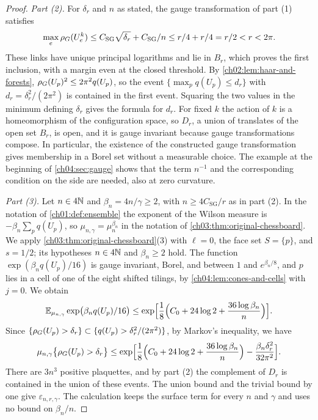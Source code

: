 \begin{proof}
\emph{Part (2).} For $\delta_r$ and $n$ as stated, the gauge transformation of part (1) satisfies
\[
 \max_e\rho_G(U^k_e)\le C_{\mathrm{SG}}\sqrt{\delta_r}+C_{\mathrm{SG}}/n\le r/4+r/4=r/2<r<2\pi.
\]
These links have unique principal logarithms and lie in $B_r$, which proves the first inclusion, with a margin even at the closed threshold. By \cref{ch02:lem:haar-and-forests}, $\rho_G(U_p)^2\le2\pi^2q(U_p)$, so the event $\{\max_pq(U_p)\le d_r\}$ with $d_r=\delta_r^2/(2\pi^2)$ is contained in the first event. Squaring the two values in the minimum defining $\delta_r$ gives the formula for $d_r$. For fixed $k$ the action of $k$ is a homeomorphism of the configuration space, so $D_r$, a union of translates of the open set $B_r$, is open, and it is gauge invariant because gauge transformations compose. In particular, the existence of the constructed gauge transformation gives membership in a Borel set without a measurable choice. The example at the beginning of \cref{ch04:sec:gauge} shows that the term $n^{-1}$ and the corresponding condition on the side are needed, also at zero curvature.

\emph{Part (3).} Let $n\in4\mathbb N$ and $\beta_n=4n/\gamma\ge2$, with $n\ge4C_{\mathrm{SG}}/r$ as in part (2). In the notation of \cref{ch01:def:ensemble} the exponent of the Wilson measure is $-\beta_n\sum_pq(U_p)$, so $\mu_{n,\gamma}=\mu_n^{\beta_n}$ in the notation of \cref{ch03:thm:original-chessboard}. We apply \cref{ch03:thm:original-chessboard}(3) with $\ell=0$, the face set $S=\{p\}$, and $s=1/2$; its hypotheses $n\in4\mathbb N$ and $\beta_n\ge2$ hold. The function $\exp(\beta_nq(U_p)/16)$ is gauge invariant, Borel, and between $1$ and $e^{\beta_n/8}$, and $p$ lies in a cell of one of the eight shifted tilings, by \cref{ch04:lem:cones-and-cells} with $j=0$. We obtain
\[
 \mathbb E_{\mu_{n,\gamma}}\exp\bigl(\beta_nq(U_p)/16\bigr)\le\exp\Bigl[\frac18\Bigl(C_0+24\log2+\frac{36\log\beta_n}n\Bigr)\Bigr].
\]
Since $\{\rho_G(U_p)>\delta_r\}\subset\{q(U_p)>\delta_r^2/(2\pi^2)\}$, by Markov's inequality, we have
\[
 \mu_{n,\gamma}\bigl\{\rho_G(U_p)>\delta_r\bigr\}\le\exp\Bigl[\frac18\Bigl(C_0+24\log2+\frac{36\log\beta_n}n\Bigr)-\frac{\beta_n\delta_r^2}{32\pi^2}\Bigr].
\]
There are $3n^3$ positive plaquettes, and by part (2) the complement of $D_r$ is contained in the union of these events. The union bound and the trivial bound by one give $\varepsilon_{n,r,\gamma}$. The calculation keeps the surface term for every $n$ and $\gamma$ and uses no bound on $\beta_n/n$.


\end{proof}
